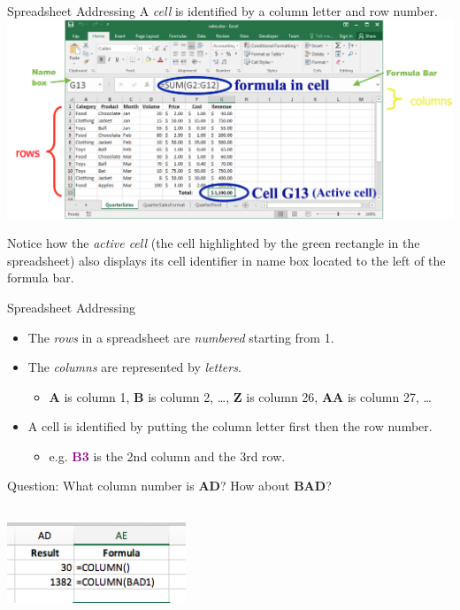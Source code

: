 \documentclass[xcolor=svgnames]{beamer}
\newcommand{\cell}[1]{{\sf \textbf{\textcolor{DarkMagenta}{#1}}}}
\begin{document}
\begin{frame}{Spreadsheet Addressing}
A \emph{cell} is identified by a column letter and row number.\vspace{2mm}
\hspace*{-6mm}                                                           
 \includegraphics[width=1.1\textwidth]{ExcelSheet.png}
 
 Notice how the  \emph{active cell} (the cell  highlighted by the green rectangle in the spreadsheet) also displays its cell identifier in name box located to the left of the formula bar.
\end{frame}


\begin{frame}{Spreadsheet Addressing}
\begin{itemize}
\item The \emph{rows} in a spreadsheet are \emph{numbered} starting from 1.
\item The \emph{columns} are represented by \emph{letters}.  
\begin{itemize}
\item \textbf A is column 1, \textbf B is column 2, \dots, \textbf Z is column 26, {\bf AA} is column 27, \dots
\end{itemize}
\item  A cell is identified by putting the column letter first then the row number.  
\begin{itemize}
\item e.g. \cell{B3} is the 2nd column and the 3rd row.
\end{itemize}
\end{itemize}
Question: What column number is \textbf{AD}?  How about \textbf{BAD}?
\begin{center}
\includegraphics[width=0.4\textwidth]{ColumnRef}
\end{center}
\end{frame}
\end{document}
